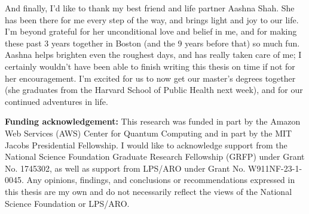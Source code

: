 \begin{onehalfspacing}
And finally, I'd like to thank my best friend and life partner Aashna Shah. She has been there for me every step of the way, and brings light and joy to our life. I'm beyond grateful for her unconditional love and belief in me, and for making these past 3 years together in Boston (and the 9 years before that) so much fun. Aashna helps brighten even the roughest days, and has really taken care of me; I certainly wouldn't have been able to finish writing this thesis on time if not for her encouragement. I'm excited for us to now get our master's degrees together (she graduates from the Harvard School of Public Health next week), and for our continued adventures in life. 





\vfill
{\small 
\noindent \textbf{Funding acknowledgement:} This research was funded in part by the Amazon Web Services (AWS) Center for Quantum Computing and in part by the MIT Jacobs Presidential Fellowship. I would like to acknowledge support from the National Science Foundation Graduate Research Fellowship (GRFP) under Grant No. 1745302, as well as support from LPS/ARO under Grant No. W911NF-23-1-0045. Any opinions, findings, and conclusions or recommendations expressed in this thesis are my own and do not necessarily reflect the views of the National Science Foundation or LPS/ARO.
}









\end{onehalfspacing}